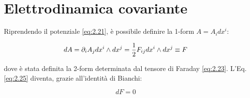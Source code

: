 \section{Elettrodinamica covariante}

Riprendendo il potenziale \ref{eq:2.21}, è possibile definire la 1-form $ A = A_i dx^i $:

\begin{equation}
	dA = \partial_i A_j dx^i \wedge dx^j = \frac{1}{2} F_{ij} dx^i \wedge dx^j \equiv F
	\label{eq:3.13}
\end{equation}

dove è stata definita la 2-form determinata dal tensore di Faraday \ref{eq:2.23}. L'Eq. \ref{eq:2.25} diventa, grazie all'identità di Bianchi:

\begin{equation}
	dF = 0
	\label{eq:3.14}
\end{equation}

